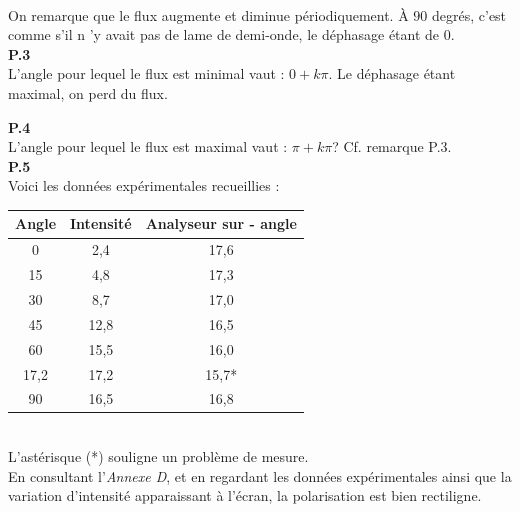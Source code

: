 \documentclass	[11pt, a4paper, openany]{book}
\begin{document}
		\begin{center}
		\end{center}\ \\
		On remarque que le flux augmente et diminue périodiquement. À $90$ degrés, c'est comme s'il n 'y avait pas de lame de demi-onde, le déphasage étant de 0.\\
		
		\textbf{P.3}\\
		L'angle pour lequel le flux est minimal vaut : $0 + k\pi$. Le déphasage étant maximal, on perd du flux.
		
		\textbf{P.4}\\
		L'angle pour lequel le flux est maximal vaut : $\pi + k\pi$? Cf. remarque P.3.\\
		
		\textbf{P.5}\\
		Voici les données expérimentales recueillies : 
		\begin{center}
			\begin{tabular}{|c|c|c|}
				\hline 
				Angle & Intensité & Analyseur sur - angle \\ 
				\hline 
				0     & 2,4        & 17,6                  \\ 
				\hline 
				15    & 4,8        & 17,3                  \\ 
				\hline 
				30    & 8,7        & 17,0                  \\ 
				\hline 
				45    & 12,8       & 16,5                  \\ 
				\hline 
				60    & 15,5       & 16,0                  \\ 
				\hline 
				17,2  & 17,2       & 15,7*                 \\ 
				\hline 
				90    & 16,5       & 16,8                  \\ 
				\hline 
			\end{tabular} 
		\end{center}\ \\
		L'astérisque (*) souligne un problème de mesure.\\
		En consultant l'\textit{Annexe D}, et en regardant les données expérimentales ainsi que la variation d'intensité apparaissant à l'écran, la polarisation est bien rectiligne.
		
\end{document}
